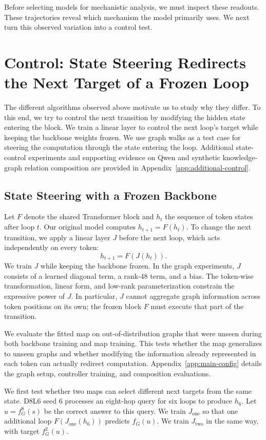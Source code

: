 \documentclass{article}
\begin{document}
Before selecting models for mechanistic analysis, we must inspect these readouts. These trajectories reveal which mechanism the model primarily uses. We next turn this observed variation into a control test.

\section{Control: State Steering Redirects the Next Target of a Frozen Loop}
\label{sec:target}
The different algorithms observed above motivate us to study why they differ. To this end, we try to control the next transition by modifying the hidden state entering the block. We train a linear layer to control the next loop's target while keeping the backbone weights frozen. We use graph walks as a test case for steering the computation through the state entering the loop. Additional state-control experiments and supporting evidence on Qwen and synthetic knowledge-graph relation composition are provided in Appendix~\ref{app:additional-control}.

\subsection{State Steering with a Frozen Backbone}
Let $F$ denote the shared Transformer block and $h_t$ the sequence of token states after loop $t$. Our original model computes $h_{t+1}=F(h_t)$. To change the next transition, we apply a linear layer $J$ before the next loop, which acts independently on every token:
\begin{equation}
 h_{t+1}=F(J(h_t)).
\end{equation}
We train $J$ while keeping the backbone frozen. In the graph experiments, $J$ consists of a learned diagonal term, a rank-48 term, and a bias. The token-wise transformation, linear form, and low-rank parameterization constrain the expressive power of $J$. In particular, $J$ cannot aggregate graph information across token positions on its own; the frozen block $F$ must execute that part of the transition.

We evaluate the fitted map on out-of-distribution graphs that were unseen during both backbone training and map training. This tests whether the map generalizes to unseen graphs and whether modifying the information already represented in each token can actually redirect computation. Appendix~\ref{app:main-config} details the graph setup, controller training, and composition evaluations.

We first test whether two maps can select different next targets from the same state. D8L6 seed 6 processes an eight-hop query for six loops to produce $h_6$. Let $u=f_G^8(s)$ be the correct answer to this query. We train $J_{\mathrm{one}}$ so that one additional loop $F(J_{\mathrm{one}}(h_6))$ predicts $f_G(u)$. We train $J_{\mathrm{two}}$ in the same way, with target $f_G^2(u)$.
\end{document}
